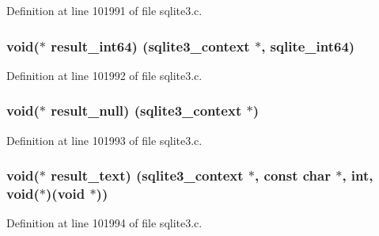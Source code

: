 Definition at line 101991 of file sqlite3.\+c.

\hypertarget{structsqlite3__api__routines_a7f590fad87a305a9f66bae82d2d9c3ba}{}
\subsubsection[{result\+\_\+int64}]{\setlength{\rightskip}{0pt plus 5cm}void($\ast$ result\+\_\+int64) ({\bf sqlite3\+\_\+context} $\ast$, {\bf sqlite\+\_\+int64})}\label{structsqlite3__api__routines_a7f590fad87a305a9f66bae82d2d9c3ba}


Definition at line 101992 of file sqlite3.\+c.

\hypertarget{structsqlite3__api__routines_a09fc82ef59beb0f303e4c68e748adeb6}{}
\subsubsection[{result\+\_\+null}]{\setlength{\rightskip}{0pt plus 5cm}void($\ast$ result\+\_\+null) ({\bf sqlite3\+\_\+context} $\ast$)}\label{structsqlite3__api__routines_a09fc82ef59beb0f303e4c68e748adeb6}


Definition at line 101993 of file sqlite3.\+c.

\hypertarget{structsqlite3__api__routines_af0c394a09036ff030c268b8277341214}{}
\subsubsection[{result\+\_\+text}]{\setlength{\rightskip}{0pt plus 5cm}void($\ast$ result\+\_\+text) ({\bf sqlite3\+\_\+context} $\ast$, const char $\ast$, int, void($\ast$)(void $\ast$))}\label{structsqlite3__api__routines_af0c394a09036ff030c268b8277341214}


Definition at line 101994 of file sqlite3.\+c.

\hypertarget{structsqlite3__api__routines_ab1869eccf5949255f142c9f09709c8d9}{}
